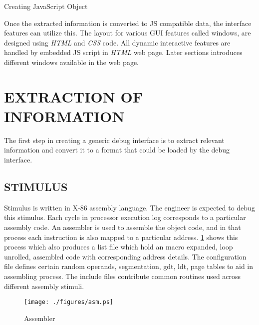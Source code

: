 \IncMargin{1em}
\begin{algorithm}[h]
\DontPrintSemicolon
{} 
\KwFn {}
\BlankLine
{}
\caption{Creating JavaScript Object}
\label{algo:impl:js}
\end{algorithm}\DecMargin{1em}



Once the extracted information is converted to JS compatible data, the interface features can utilize this. The layout for various GUI features called windows, are designed using {\it HTML} and {\it CSS} code. All dynamic interactive features are handled by embedded JS script in {\it HTML} web page. Later sections introduces different windows available in the web page.

\section {EXTRACTION OF INFORMATION}
The first step in creating a generic debug interface is to extract relevant information and convert it to a format that could be loaded by the debug interface.

\subsection {STIMULUS}
Stimulus is written in X-86 assembly language. The engineer is expected to debug this stimulus. Each cycle in processor execution log corresponds to a particular assembly code. An assembler is used to assemble the object code, and in that process each instruction is also mapped to a particular address. \figurename{\ref{impl.tex:assembler}} shows this process which also produces a list file which hold an macro expanded, loop unrolled, assembled code with corresponding address details. The configuration file defines certain random operands, segmentation, gdt, ldt, page tables to aid in assembling process. The include files contribute common routines used across different assembly stimuli.


\begin{figure}[h]
\centering
\texttt{[image: ./figures/asm.ps]}
\caption{Assembler}
\label{impl.tex:assembler}
\end{figure}


